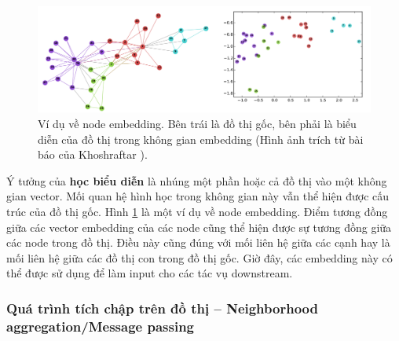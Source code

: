 \begin{figure} [H]
    \centering
    \includegraphics[scale=0.35]{images/Chapter2/node-embedding.png}
    \caption[Ví dụ về node embedding.]{Ví dụ về node embedding. Bên trái là đồ thị gốc, bên phải là biểu diễn của đồ thị trong không gian embedding (Hình ảnh trích từ bài báo của Khoshraftar \cite{survey:graph-rep-learning}).}
    \label{fig:node-embed-example}
\end{figure}

Ý tưởng của \textbf{học biểu diễn} là nhúng một phần hoặc cả đồ thị vào một không gian vector. Mối quan hệ hình học trong không gian này vẫn thể hiện được cấu trúc của đồ thị gốc. Hình \ref{fig:node-embed-example} là một ví dụ về node embedding. Điểm tương đồng giữa các vector embedding của các node cũng thể hiện được sự tương đồng giữa các node trong đồ thị. Điều này cũng đúng với mối liên hệ giữa các cạnh hay là mối liên hệ giữa các đồ thị con trong đồ thị gốc. Giờ đây, các embedding này có thể được sử dụng để làm input cho các tác vụ downstream.

\subsubsection{Quá trình tích chập trên đồ thị -- Neighborhood aggregation/Message passing}

